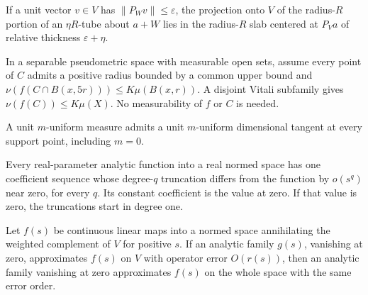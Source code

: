 \begin{lemma}
\label{lem:projected-tube-contained-slab}

If a unit vector $v\in V$ has $\|P_Wv\|\le\varepsilon$, the projection onto $V$ of the radius-$R$ portion of an $\eta R$-tube about $a+W$ lies in the radius-$R$ slab centered at $P_Va$ of relative thickness $\varepsilon+\eta$.
\end{lemma}

\begin{lemma}
\label{lem:fivefold-image-covering}

In a separable pseudometric space with measurable open sets, assume every point of $C$ admits a positive radius bounded by a common upper bound and $\nu(f(C\cap B(x,5r)))\le K\mu(B(x,r))$. A disjoint Vitali subfamily gives $\nu(f(C))\le K\mu(X)$. No measurability of $f$ or $C$ is needed.
\end{lemma}

\begin{lemma}
\label{lem:unit-uniform-tangent-existence}

A unit $m$-uniform measure admits a unit $m$-uniform dimensional tangent at every support point, including $m=0$.
\end{lemma}

\begin{lemma}
\label{lem:analytic-finite-jets}

Every real-parameter analytic function into a real normed space has one coefficient sequence whose degree-$q$ truncation differs from the function by $o(s^q)$ near zero, for every $q$. Its constant coefficient is the value at zero. If that value is zero, the truncations start in degree one.
\end{lemma}

\begin{lemma}
\label{lem:analytic-projection-approximation}

Let $f(s)$ be continuous linear maps into a normed space annihilating the weighted complement of $V$ for positive $s$. If an analytic family $g(s)$, vanishing at zero, approximates $f(s)$ on $V$ with operator error $O(r(s))$, then an analytic family vanishing at zero approximates $f(s)$ on the whole space with the same error order.
\end{lemma}

